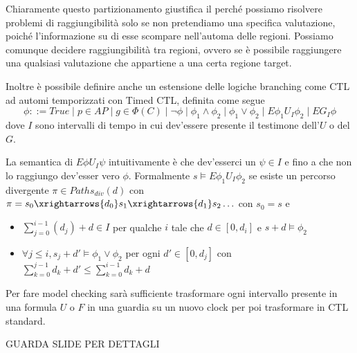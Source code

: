 Chiaramente questo partizionamento giustifica il perché possiamo risolvere problemi di raggiungibilità solo se non pretendiamo una specifica valutazione, poiché l'informazione su di esse scompare nell'automa delle regioni. Possiamo comunque decidere raggiungibilità tra regioni, ovvero se è possibile raggiungere una qualsiasi valutazione che appartiene a una certa regione target.

Inoltre è possibile definire anche un estensione delle logiche branching come CTL ad automi temporizzati con Timed CTL, definita come segue
\[\phi ::= True\mid p \in AP\mid g \in \Phi(C)\mid \neg \phi\mid \phi_1\land\phi_2\mid \phi_1\lor\phi_2\mid E \phi_1 U_I \phi_2 \mid E G_I \phi\]
dove \(I\) sono intervalli di tempo in cui dev'essere presente il testimone dell'\(U\) o del \(G\).

La semantica di \(E \phi U_I \psi\) intuitivamente è che dev'esserci un \(\psi \in I\) e fino a che non lo raggiungo dev'esser vero \(\phi\). Formalmente 
\(s\models E \phi_1 U_I \phi_2\) se esiste un percorso divergente \(\pi\in Paths_{div}(d)\) con \(\pi = s_0 \xrightarrows{d_0} s_1 \xrightarrows{d_1} s_2 \ldots\) con \(s_0 = s\) e
\begin{itemize}
  \item \(\sum_{j=0}^{i-1} (d_j )+ d \in I\) per qualche \(i\) tale che \(d \in [0,d_i]\) e \(s+d\models \phi_2\)
  \item \(\forall j\leq i, s_j+d' \models \phi_1\lor \phi_2\) per ogni \(d' \in [0,d_j]\) con \(\sum_{k=0}^{j-1} d_k+d' \leq \sum_{k=0}^{i-1} d_k + d\)
\end{itemize}

Per fare model checking sarà sufficiente trasformare ogni intervallo presente in una formula \(U\) o \(F\) in una guardia su un nuovo clock per poi trasformare in CTL standard.

GUARDA SLIDE PER DETTAGLI